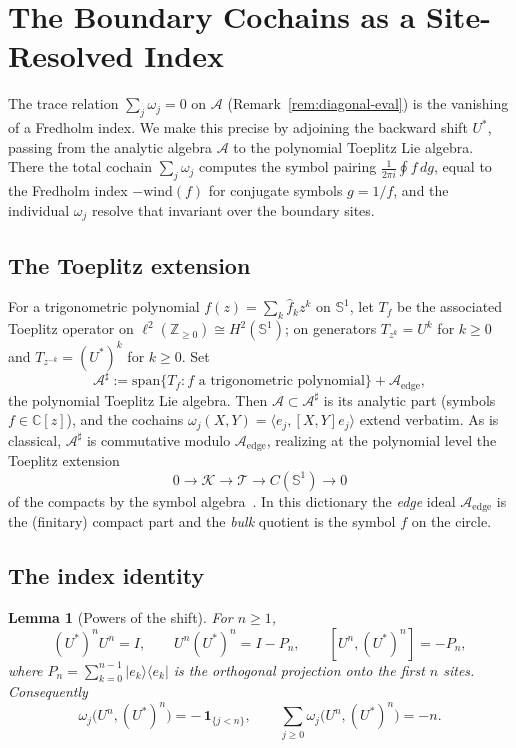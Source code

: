 \documentclass[10pt]{amsart}
\newcommand{\1}{{\mathbb{I}}}
\newtheorem{lemma}[theorem]{Lemma}
\numberwithin{equation}{section}
\begin{document}
\section{The Boundary Cochains as a Site-Resolved Index}
\label{sec:index}

The trace relation $\sum_j\omega_j=0$ on $\mathcal{A}$ (Remark~\ref{rem:diagonal-eval}) is the
vanishing of a Fredholm index. We make this precise by adjoining
the backward shift $U^*$, passing from the analytic algebra $\mathcal{A}$ to the polynomial
Toeplitz Lie algebra. There the total cochain $\sum_j\omega_j$ computes the symbol pairing
$\frac{1}{2\pi i}\oint f\,dg$, equal to the Fredholm index $-\mathrm{wind}(f)$ for conjugate
symbols $g=1/f$, and the individual $\omega_j$ resolve that invariant over the boundary sites.

\subsection{The Toeplitz extension}
\label{sec:toeplitz-ext}

For a trigonometric polynomial $f(z)=\sum_k\hat f_k z^k$ on $\mathbb{S}^1$, let $T_f$ be the
associated Toeplitz operator on $\ell^2(\mathbb{Z}_{\ge 0})\cong H^2(\mathbb{S}^1)$; on generators
$T_{z^k}=U^k$ for $k\ge0$ and $T_{z^{-k}}=(U^*)^k$ for $k\ge0$. Set
\[
\mathcal{A}^\sharp := \mathrm{span}\{T_f : f \text{ a trigonometric polynomial}\}
  + \mathcal{A}_{\mathrm{edge}},
\]
the polynomial Toeplitz Lie algebra. Then $\mathcal{A}\subset\mathcal{A}^\sharp$ is its analytic
part (symbols $f\in\mathbb{C}[z]$), and the cochains $\omega_j(X,Y)=\langle e_j,[X,Y]e_j\rangle$
extend verbatim. As is classical, $\mathcal{A}^\sharp$ is commutative modulo
$\mathcal{A}_{\mathrm{edge}}$, realizing at the polynomial level the Toeplitz extension
\[
0 \longrightarrow \mathcal{K} \longrightarrow \mathcal{T}
  \longrightarrow C(\mathbb{S}^1) \longrightarrow 0
\]
of the compacts by the symbol algebra~\cite{BotSil06,Dou98,AriciMesland}. In this dictionary the
\emph{edge} ideal $\mathcal{A}_{\mathrm{edge}}$ is the (finitary) compact part and the
\emph{bulk} quotient is the symbol $f$ on the circle.

\subsection{The index identity}
\label{sec:index-identity}

\begin{lemma}[Powers of the shift]\label{lem:shift-powers}
For $n\ge1$,
\[
(U^*)^n U^n = I,\qquad U^n(U^*)^n = I-P_n,\qquad [U^n,(U^*)^n] = -P_n,
\]
where $P_n=\sum_{k=0}^{n-1}|e_k\rangle\langle e_k|$ is the orthogonal projection onto the first
$n$ sites. Consequently
\[
\omega_j\bigl(U^n,(U^*)^n\bigr) = -\,\mathbf{1}_{\{j<n\}},\qquad
\sum_{j\ge0}\omega_j\bigl(U^n,(U^*)^n\bigr) = -n.
\]
\end{lemma}
\end{document}
